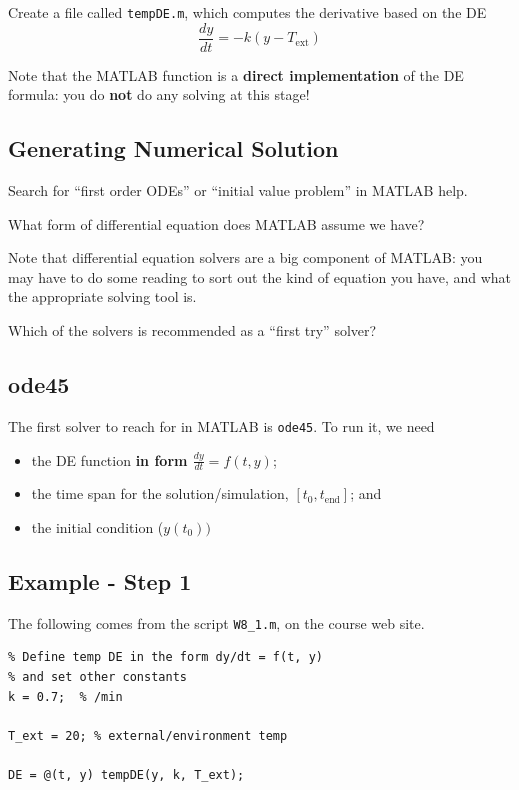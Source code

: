 \problem Create a file called \texttt{tempDE.m}, which
computes the derivative based on the DE
$$\frac{dy}{dt} = -k (y - T_{\mbox{ext}})$$

\vsc

Note that the MATLAB function is a {\bf direct implementation} of the
DE formula: you do {\bf not} do any solving at this stage!

\newpage

\subsection*{Generating Numerical Solution}

\problem Search for ``first order ODEs'' or ``initial value problem''
  in MATLAB help.
\vsc 
\vsc 

\problem What form of differential equation does MATLAB assume we have?

\vsc
\vsc


\newpage

Note that differential equation solvers are a big component of MATLAB:
you may have to do some reading to sort out the kind of equation you
have, and what the appropriate solving tool is.

\problem Which of the solvers is recommended as a ``first try'' solver?

\vsc
\vsc

\newpage

\subsection*{ode45}
The first solver to reach for in MATLAB is \verb#ode45#.  To run it, we need
\begin{itemize} 
\item the DE function {\bf in form $\displaystyle \frac{dy}{dt} = f(t, y)$};
\vfill
\item the time span for the solution/simulation, $[t_0, t_{\mbox{end}}]$; and
\vfill
\item the initial condition ($y(t_0))$
\vfill
\end{itemize}

\newpage

\subsection*{Example - Step 1}
The following comes from the script \texttt{W8\_1.m}, on the course
web site.
\begin{verbatim}
% Define temp DE in the form dy/dt = f(t, y)
% and set other constants
k = 0.7;  % /min

T_ext = 20; % external/environment temp

DE = @(t, y) tempDE(y, k, T_ext);

\end{verbatim}

